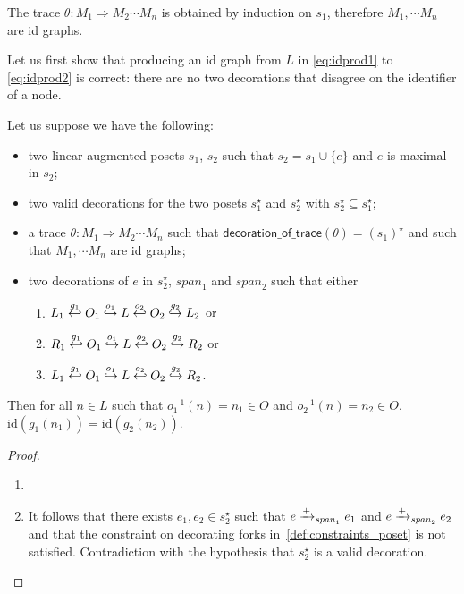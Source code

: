The trace $\theta:M_1\Rightarrow M_2\cdots M_n$ is obtained by induction on $s_1$, therefore $M_1,\cdots M_n$ are id graphs.

Let us first show that producing an id graph from $L$ in \autoref{eq:idprod1} to \autoref{eq:idprod2} is correct: there are no two decorations that disagree on the identifier of a node.

\begin{lemma}
  Let us suppose we have the following:
  \begin{itemize}
  \item two linear augmented posets $s_1$, $s_2$ such that $s_2=s_1\cup\{e\}$ and $e$ is maximal in $s_2$;
  \item two valid decorations for the two posets $s_1^{\star}$ and $s_2^{\star}$ with $s_2^{\star}\subseteq s_1^{\star}$;
  \item a trace $\theta:M_1\Rightarrow M_2\cdots M_n$ such that $\mathsf{decoration\_of\_trace}(\theta)=(s_1)^{\star}$ and such that $M_1,\cdots M_n$ are id graphs;
  \item two decorations of $e$ in $s_2^{\star}$, $\mathit{span}_1$ and $\mathit{span}_2$ such that either
    \begin{enumerate}
    \item $L_1 \overset{g_1}{\hookleftarrow} O_1 \overset{o_1}{\hookrightarrow} L \overset{o_2}{\hookleftarrow} O_2\overset{g_2}{\hookrightarrow} L_2$ or
    \item $R_1 \overset{g_1}{\hookleftarrow} O_1 \overset{o_1}{\hookrightarrow} L \overset{o_2}{\hookleftarrow} O_2\overset{g_2}{\hookrightarrow} R_2$ or
    \item $L_1 \overset{g_1}{\hookleftarrow} O_1 \overset{o_1}{\hookrightarrow} L \overset{o_2}{\hookleftarrow} O_2\overset{g_2}{\hookrightarrow} R_2$.
    \end{enumerate}
  \end{itemize}
  Then for all $n\in L$ such that $o_1^{-1}(n) = n_1\in O$ and $o_2^{-1}(n) = n_2\in O$, $\text{id}(g_1(n_1)) = \text{id}(g_2(n_2))$.
\end{lemma}
\begin{proof}
  \begin{enumerate}
  \item
  \item It follows that there exists $e_1,e_2\in s_2^{\star}$ such that $e\mathrel{\xrightarrow{+}}_{\mathit{span}_1} e_1$ and $e\mathrel{\xrightarrow{+}}_{\mathit{span}_2} e_2$ and that the constraint on decorating forks in~\autoref{def:constraints_poset} is not satisfied. Contradiction with the hypothesis that $s_2^{\star}$ is a valid decoration.
  \end{enumerate}
\end{proof}
